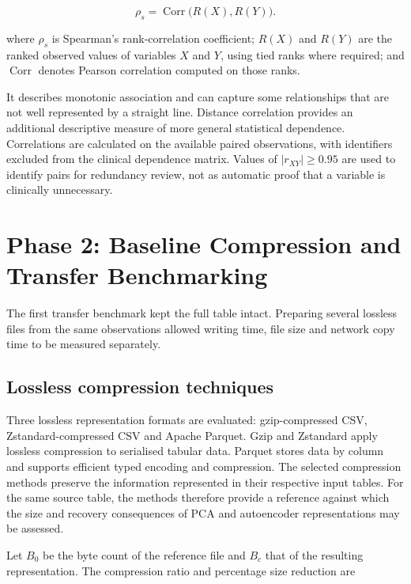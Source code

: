 \[
\rho_s=\operatorname{Corr}\!\bigl(R(X),R(Y)\bigr).\tag{3.4.3}
\]

\noindent where \(\rho_s\) is Spearman's rank-correlation coefficient; \(R(X)\)
and \(R(Y)\) are the ranked observed values of variables \(X\) and
\(Y\), using tied ranks where required; and \(\operatorname{Corr}\)
denotes Pearson correlation computed on those ranks.

\noindent It describes monotonic association and can capture some relationships
that are not well represented by a straight line. Distance correlation
provides an additional descriptive measure of more general statistical
dependence. Correlations are calculated on the available paired
observations, with identifiers excluded from the clinical dependence
matrix. Values of \(|r_{XY}|\geq0.95\) are used to identify pairs for
redundancy review, not as automatic proof that a variable is clinically
unnecessary.

\section{Phase 2: Baseline Compression and Transfer Benchmarking}\label{phase-2-baseline-compression-and-transfer-benchmarking}

\noindent The first transfer benchmark kept the full table intact. Preparing several lossless files from the same observations allowed writing time, file size and network copy time to be measured separately.

\subsection{Lossless compression techniques}\label{lossless-compression-techniques}

Three lossless representation formats are evaluated: gzip-compressed
CSV, Zstandard-compressed CSV and Apache Parquet. Gzip and Zstandard
apply lossless compression to serialised tabular data. Parquet stores
data by column and supports efficient typed encoding and compression.
The selected compression methods preserve the information represented in
their respective input tables. For the same source table, the methods
therefore provide a reference against which the size and recovery
consequences of PCA and autoencoder representations may be assessed.

\noindent Let \(B_0\) be the byte count of the reference file and \(B_c\) that of
the resulting representation. The compression ratio and percentage size
reduction are

